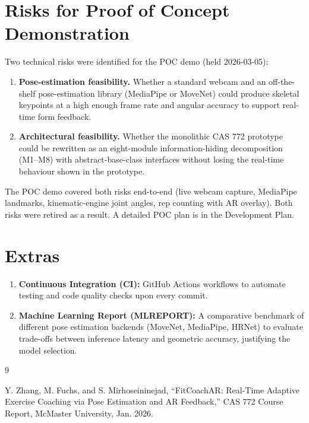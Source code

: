 \documentclass{article}
\begin{document}
\section{Risks for Proof of Concept Demonstration}

Two technical risks were identified for the POC demo (held 2026-03-05):

\begin{enumerate}
    \item \textbf{Pose-estimation feasibility.} Whether a standard webcam and an off-the-shelf pose-estimation library (MediaPipe or MoveNet) could produce skeletal keypoints at a high enough frame rate and angular accuracy to support real-time form feedback.
    \item \textbf{Architectural feasibility.} Whether the monolithic CAS 772 prototype could be rewritten as an eight-module information-hiding decomposition (M1--M8) with abstract-base-class interfaces without losing the real-time behaviour shown in the prototype.
\end{enumerate}

The POC demo covered both risks end-to-end (live webcam capture, MediaPipe landmarks, kinematic-engine joint angles, rep counting with AR overlay). Both risks were retired as a result. A detailed POC plan is in the Development Plan.

\section{Extras}

\begin{enumerate}
    \item \textbf{Continuous Integration (CI):} GitHub Actions workflows to automate testing and code quality checks upon every commit.
    \item \textbf{Machine Learning Report (MLREPORT):} A comparative benchmark of different pose estimation backends (MoveNet, MediaPipe, HRNet) to evaluate trade-offs between inference latency and geometric accuracy, justifying the model selection.
\end{enumerate}

\begin{thebibliography}{9}

Y. Zhang, M. Fuchs, and S. Mirhoseininejad, 
``FitCoachAR: Real-Time Adaptive Exercise Coaching via Pose Estimation and AR Feedback,'' 
CAS 772 Course Report, McMaster University, Jan. 2026.

\end{thebibliography}
\end{document}
